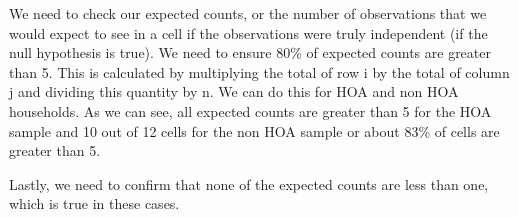 \documentclass{article}
\begin{document}
We need to check our expected counts, or the number of observations that we would expect to see in a cell if the observations were truly independent (if the null hypothesis is true). We need to ensure 80\% of expected counts are greater than 5. This is calculated by multiplying the total of row i by the total of column j and dividing this quantity by n. We can do this for HOA and non HOA households. 
\newline
\newline
{}
As we can see, all expected counts are greater than 5 for the HOA sample and 10 out of 12 cells for the non HOA sample or about 83\% of cells are greater than 5.

Lastly, we need to confirm that none of the expected counts are less than one, which is true in these cases. 
\end{document}
